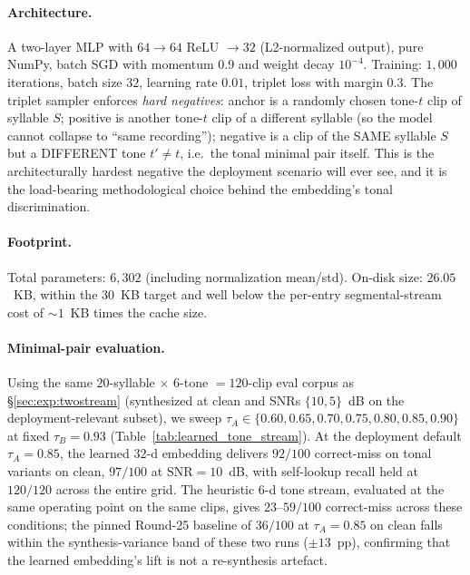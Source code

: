 \documentclass[a4paper,fleqn]{cas-dc}
\begin{document}
\paragraph{Architecture.} A two-layer MLP with $64 \to 64$ ReLU $\to 32$ (L2-normalized output), pure NumPy, batch SGD with momentum $0.9$ and weight decay $10^{-4}$. Training: $1{,}000$ iterations, batch size $32$, learning rate $0.01$, triplet loss with margin $0.3$. The triplet sampler enforces \emph{hard negatives}: anchor is a randomly chosen tone-$t$ clip of syllable $S$; positive is another tone-$t$ clip of a different syllable (so the model cannot collapse to ``same recording''); negative is a clip of the SAME syllable $S$ but a DIFFERENT tone $t' \neq t$, i.e.\ the tonal minimal pair itself. This is the architecturally hardest negative the deployment scenario will ever see, and it is the load-bearing methodological choice behind the embedding's tonal discrimination.

\paragraph{Footprint.} Total parameters: $6{,}302$ (including normalization mean/std). On-disk size: $\mathbf{26.05}$~KB, within the $30$~KB target and well below the per-entry segmental-stream cost of $\sim\!1$~KB times the cache size.

\paragraph{Minimal-pair evaluation.} Using the same $20$-syllable $\times$ $6$-tone $=120$-clip eval corpus as \S\ref{sec:exp:twostream} (synthesized at clean and SNRs $\{10, 5\}$~dB on the deployment-relevant subset), we sweep $\tau_A \in \{0.60, 0.65, 0.70, 0.75, 0.80, 0.85, 0.90\}$ at fixed $\tau_B = 0.93$ (Table~\ref{tab:learned_tone_stream}). At the deployment default $\tau_A = 0.85$, the learned $32$-d embedding delivers $92/100$ correct-miss on tonal variants on clean, $97/100$ at $\mathrm{SNR}=10$~dB, with self-lookup recall held at $120/120$ across the entire grid. The heuristic 6-d tone stream, evaluated at the same operating point on the same clips, gives $23$--$59/100$ correct-miss across these conditions; the pinned Round-25 baseline of $36/100$ at $\tau_A = 0.85$ on clean falls within the synthesis-variance band of these two runs ($\pm 13$~pp), confirming that the learned embedding's lift is not a re-synthesis artefact.
\end{document}
